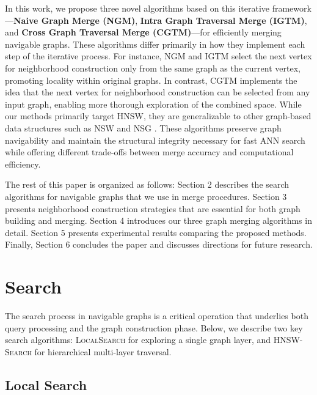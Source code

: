 \documentclass{article}
\begin{document}
In this work, we propose three novel algorithms based on this iterative framework—\textbf{Naive Graph Merge (NGM)}, \textbf{Intra Graph Traversal Merge (IGTM)}, and \textbf{Cross Graph Traversal Merge (CGTM)}—for efficiently merging navigable graphs. These algorithms differ primarily in how they implement each step of the iterative process. For instance, NGM and IGTM select the next vertex for neighborhood construction only from the same graph as the current vertex, promoting locality within original graphs. In contrast, CGTM implements the idea that the next vertex for neighborhood construction can be selected from any input graph, enabling more thorough exploration of the combined space. While our methods primarily target HNSW, they are generalizable to other graph-based data structures such as NSW \cite{nsw2011} and NSG \cite{NSG}. These algorithms preserve graph navigability and maintain the structural integrity necessary for fast ANN search while offering different trade-offs between merge accuracy and computational efficiency.

The rest of this paper is organized as follows: Section 2 describes the search algorithms for navigable graphs that we use in merge procedures. Section 3 presents neighborhood construction strategies that are essential for both graph building and merging. Section 4 introduces our three graph merging algorithms in detail. Section 5 presents experimental results comparing the proposed methods. Finally, Section 6 concludes the paper and discusses directions for future research.

\section{Search}

The search process in navigable graphs is a critical operation that underlies both query processing and the graph construction phase. Below, we describe two key search algorithms: \textsc{LocalSearch} for exploring a single graph layer, and \textsc{HNSW-Search} for hierarchical multi-layer traversal.

\subsection{Local Search}
\end{document}
